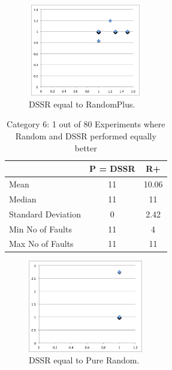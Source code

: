 \documentclass[conference]{IEEEtran}
\begin{document}
\begin{figure}[ht]
\centering
\includegraphics[width=5cm,height=4cm]{DSSRequaltoRandomPlus5.png}
\caption{DSSR equal to RandomPlus.}
\label{fig:DSSRequaltoRandomPlus}
\end{figure}



\begin{table}[H]
\caption{Category 6: 1 out of 80 Experiments where Random and DSSR performed equally better}
\centering
\begin{tabular}{|l|c|c|}
\hline\hline
 				& P = DSSR			&  R+ \\
\hline
Mean  			&    11				&  10.06\\
Median 			&    11 				&  11\\
Standard Deviation 	&    0					&  2.42\\
Min No of Faults	&    11				&  4\\
Max No of Faults 	&    11				&  11\\
\hline
\end{tabular}
\label{table:DSSRequaltoRandom}
\end{table}

\begin{figure}[H]
\centering
\includegraphics[width=5cm,height=4cm]{DSSRequaltoPureRandom5.png}
\caption{DSSR equal to Pure Random.}
\label{fig:DSSRequaltoRandom}
\end{figure}
\end{document}
